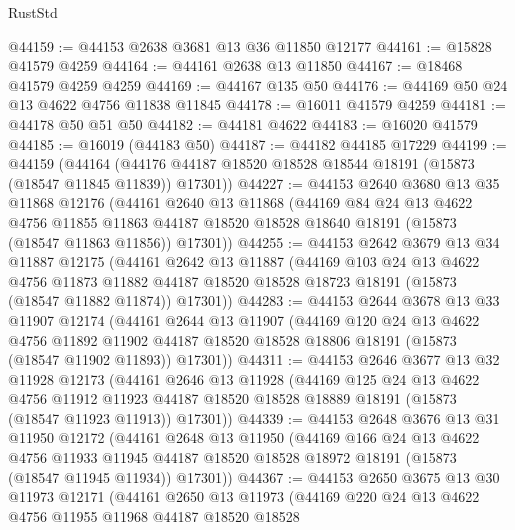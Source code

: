 \begin{lexlean}{RustStd}
\begin{coremodule}
@44159 := @44153 @2638 @3681 @13 @36 @11850 @12177
@44161 := @15828 @41579 @4259
@44164 := @44161 @2638 @13 @11850
@44167 := @18468 @41579 @4259 @4259
@44169 := @44167 @135 @50
@44176 := @44169 @50 @24 @13 @4622 @4756 @11838 @11845
@44178 := @16011 @41579 @4259
@44181 := @44178 @50 @51 @50
@44182 := @44181 @4622
@44183 := @16020 @41579
@44185 := @16019 (@44183 @50)
@44187 := @44182 @44185 @17229
@44199 := @44159
    (@44164 (@44176 @44187 @18520 @18528 @18544 @18191 (@15873 (@18547 @11845 @11839)) @17301))
@44227 := @44153
    @2640
    @3680
    @13
    @35
    @11868
    @12176
    (@44161
      @2640
      @13
      @11868
      (@44169
        @84
        @24
        @13
        @4622
        @4756
        @11855
        @11863
        @44187
        @18520
        @18528
        @18640
        @18191
        (@15873 (@18547 @11863 @11856))
        @17301))
@44255 := @44153
    @2642
    @3679
    @13
    @34
    @11887
    @12175
    (@44161
      @2642
      @13
      @11887
      (@44169
        @103
        @24
        @13
        @4622
        @4756
        @11873
        @11882
        @44187
        @18520
        @18528
        @18723
        @18191
        (@15873 (@18547 @11882 @11874))
        @17301))
@44283 := @44153
    @2644
    @3678
    @13
    @33
    @11907
    @12174
    (@44161
      @2644
      @13
      @11907
      (@44169
        @120
        @24
        @13
        @4622
        @4756
        @11892
        @11902
        @44187
        @18520
        @18528
        @18806
        @18191
        (@15873 (@18547 @11902 @11893))
        @17301))
@44311 := @44153
    @2646
    @3677
    @13
    @32
    @11928
    @12173
    (@44161
      @2646
      @13
      @11928
      (@44169
        @125
        @24
        @13
        @4622
        @4756
        @11912
        @11923
        @44187
        @18520
        @18528
        @18889
        @18191
        (@15873 (@18547 @11923 @11913))
        @17301))
@44339 := @44153
    @2648
    @3676
    @13
    @31
    @11950
    @12172
    (@44161
      @2648
      @13
      @11950
      (@44169
        @166
        @24
        @13
        @4622
        @4756
        @11933
        @11945
        @44187
        @18520
        @18528
        @18972
        @18191
        (@15873 (@18547 @11945 @11934))
        @17301))
@44367 := @44153
    @2650
    @3675
    @13
    @30
    @11973
    @12171
    (@44161
      @2650
      @13
      @11973
      (@44169
        @220
        @24
        @13
        @4622
        @4756
        @11955
        @11968
        @44187
        @18520
        @18528

\end{coremodule}
\end{lexlean}
